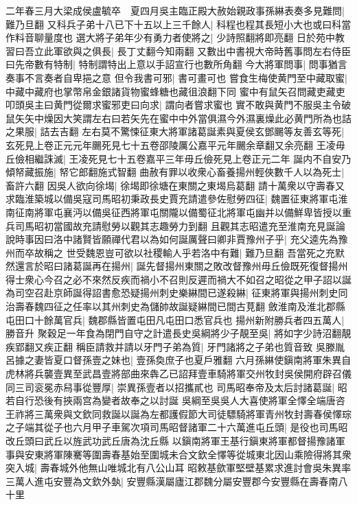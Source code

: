 二年春三月大梁成侯盧毓卒　夏四月吳主臨正殿大赦始親政事孫綝表奏多見難問|{
	難乃旦翻}
又科兵子弟十八已下十五以上三千餘人|{
	科程也程其長短小大也或曰科當作料音聊量度也}
選大將子弟年少有勇力者使將之|{
	少詩照翻將即亮翻}
日於苑中教習曰吾立此軍欲與之俱長|{
	長丁丈翻今知兩翻}
又數出中書視大帝時舊事問左右侍臣曰先帝數有特制|{
	特制謂特出上意以手詔宣行也數所角翻}
今大將軍問事|{
	問事猶言奏事不言奏者自卑挹之意}
但令我書可邪|{
	書可畫可也}
嘗食生梅使黄門至中藏取蜜|{
	中藏中藏府也掌幣帛金銀諸貨物蜜蜂糖也藏徂浪翻下同}
蜜中有鼠矢召問藏吏藏吏叩頭吳主曰黄門從爾求蜜邪吏曰向求|{
	謂向者嘗求蜜也}
實不敢與黄門不服吳主令破鼠矢矢中燥因大笑謂左右曰若矢先在蜜中中外當俱濕今外濕裏燥此必黄門所為也詰之果服|{
	詰去吉翻}
左右莫不驚悚征東大將軍諸葛誕素與夏侯玄鄧颺等友善玄等死|{
	玄死見上卷正元元年颺死見七十五卷邵陵厲公嘉平元年颺余章翻又余亮翻}
王凌毋丘儉相繼誅滅|{
	王凌死見七十五卷嘉平三年毋丘儉死見上卷正元二年}
誕内不自安乃傾帑藏振施|{
	帑它郎翻施式智翻}
曲赦有罪以收衆心畜養揚州輕俠數千人以為死士|{
	畜許六翻}
因吳人欲向徐堨|{
	徐堨即徐塘在東關之東堨烏葛翻}
請十萬衆以守壽春又求臨淮築城以備吳寇司馬昭初秉政長史賈充請遣參佐慰勞四征|{
	魏置征東將軍屯淮南征南將軍屯襄沔以備吳征西將軍屯關隴以備蜀征北將軍屯幽并以備鮮卑皆授以重兵司馬昭初當國故充請慰勞以觀其志趣勞力到翻}
且觀其志昭遣充至淮南充見誕論說時事因曰洛中諸賢皆願禪代君以為如何誕厲聲曰卿非賈豫州子乎|{
	充父逵先為豫州而卒故稱之}
世受魏恩豈可欲以社稷輸人乎若洛中有難|{
	難乃旦翻}
吾當死之充默然還言於昭曰諸葛誕再在揚州|{
	誕先督揚州東關之敗改督豫州毋丘儉既死復督揚州}
得士衆心今召之必不來然反疾而禍小不召則反遲而禍大不如召之昭從之甲子詔以誕為司空召赴京師誕得詔書愈恐疑揚州刺史樂綝間已遂殺綝|{
	征東將軍與揚州刺史同治壽春魏四征之任率以其州刺史為儲帥故誕疑綝間已間古莧翻}
斂淮南及淮北郡縣屯田口十餘萬官兵|{
	魏郡縣皆置屯田凡屯田口悉官兵也}
揚州新附勝兵者四五萬人|{
	勝音升}
聚穀足一年食為閉門自守之計遣長史吳綱將少子靚至吳|{
	將如字少詩沼翻靚疾郢翻又疾正翻}
稱臣請救并請以牙門子弟為質|{
	牙門諸將之子弟也質音致}
吳滕胤呂據之妻皆夏口督孫壹之妹也|{
	壹孫奐庶子也夏戶雅翻}
六月孫綝使鎭南將軍朱異自虎林將兵襲壹異至武昌壹將部曲來犇乙已詔拜壹車騎將軍交州牧封吳侯開府辟召儀同三司衮冕赤舄事從豐厚|{
	崇異孫壹者以招攜貳也}
司馬昭奉帝及太后討諸葛誕|{
	昭若自行恐後有挾兩宫為變者故奉之以討誕}
吳綱至吳吳人大喜使將軍全懌全端唐咨王祚將三萬衆與文欽同救誕以誕為左都護假節大司徒驃騎將軍青州牧封壽春侯懌琮之子端其從子也六月甲子車駕次項司馬昭督諸軍二十六萬進屯丘頭|{
	是役也司馬昭改丘頭曰武丘以旌武功武丘唐為沈丘縣}
以鎭南將軍王基行鎭東將軍都督揚豫諸軍事與安東將軍陳騫等圍壽春基始至圍城未合文欽全懌等從城東北因山乘險得將其衆突入城|{
	壽春城外他無山唯城北有八公山耳}
昭敕基歛軍堅壁基累求進討會吳朱異率三萬人進屯安豐為文欽外埶|{
	安豐縣漢屬廬江郡魏分屬安豐郡今安豐縣在壽春南八十里}
